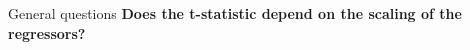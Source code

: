 \documentclass{beamer}
\begin{document}
%
%
%
%
%
%


\begin{frame}{General questions}
  \textbf{Does the t-statistic depend on the scaling of the regressors?}

%
%
\end{frame}


%
\end{document}
